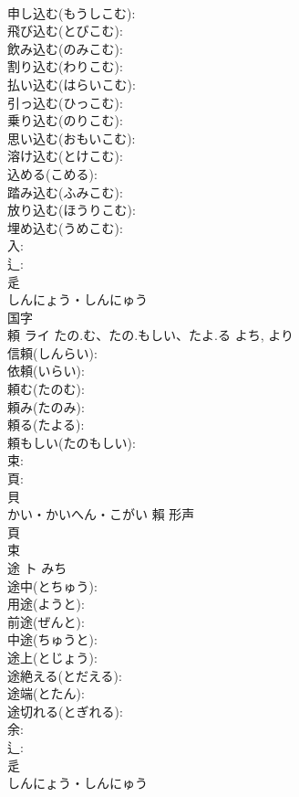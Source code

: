\documentclass[8pt]{extreport}
\begin{document}
\begin{CJK}{UTF8}{min}
\\	申し込む(もうしこむ): 
\\	飛び込む(とびこむ): 
\\	飲み込む(のみこむ): 
\\	割り込む(わりこむ): 
\\	払い込む(はらいこむ): 
\\	引っ込む(ひっこむ): 
\\	乗り込む(のりこむ): 
\\	思い込む(おもいこむ): 
\\	溶け込む(とけこむ): 
\\	込める(こめる): 
\\	踏み込む(ふみこむ): 
\\	放り込む(ほうりこむ): 
\\	埋め込む(うめこむ): 
\\	入: 
\\	辶: 
\\	辵	
\\	しんにょう・しんにゅう	
\\	国字 
\\	頼	ライ	たの.む、たの.もしい、たよ.る	よち, より	
\\	信頼(しんらい): 
\\	依頼(いらい): 
\\	頼む(たのむ): 
\\	頼み(たのみ): 
\\	頼る(たよる): 
\\	頼もしい(たのもしい): 
\\	束: 
\\	頁: 
\\	貝	
\\	かい・かいへん・こがい	賴	形声 
\\	頁 
\\	束 
\\	途	ト	みち		
\\	途中(とちゅう): 
\\	用途(ようと): 
\\	前途(ぜんと): 
\\	中途(ちゅうと): 
\\	途上(とじょう): 
\\	途絶える(とだえる): 
\\	途端(とたん): 
\\	途切れる(とぎれる): 
\\	余: 
\\	辶: 
\\	辵	
\\	しんにょう・しんにゅう	

\end{CJK}
\end{document}
